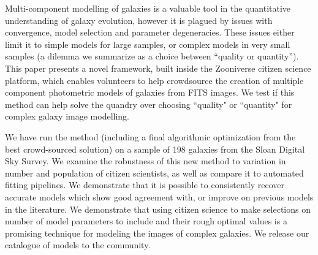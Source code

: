 \documentclass[../main.tex]{subfiles}
\begin{document}
Multi-component modelling of galaxies is a valuable tool in the quantitative understanding of galaxy evolution, however it is plagued by issues with convergence, model selection and parameter degeneracies. These issues either limit it to simple models for large samples, or complex models in very small samples  (a dilemma we summarize as a choice between “quality or quantity”). This paper presents a novel framework, built inside the Zooniverse citizen science platform, which enables volunteers to help crowdsource the creation of multiple component photometric models of galaxies from FITS images. We test if this method can help solve the quandry over choosing ``quality" or ``quantity" for complex galaxy image modelling.

We have run the method (including a final algorithmic optimization from the best crowd-sourced solution) on a sample of 198 galaxies from the Sloan Digital Sky Survey. We examine the robustness of this new method to variation in number and population of citizen scientists, as well as compare it to automated fitting pipelines. We demonstrate that it is possible to consistently recover accurate models which show good agreement with, or improve on previous models in the literature. We demonstrate that using citizen science to make selections on number of model parameters to include and their rough optimal values is a promising technique for modeling the images of complex galaxies. We release our catalogue of models to the community.
\end{document}
